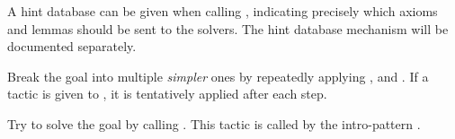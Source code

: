 A hint database can be given when calling , indicating precisely which
axioms and lemmas should be sent to the solvers. The hint database mechanism
will be documented separately.

Break the goal into multiple \emph{simpler} ones by repeatedly applying
,  and . If a tactic is given to \tacname{},
it is tentatively applied after each step.


Try to solve the goal by calling .
This tactic is called by the intro-pattern \ec{//}.
